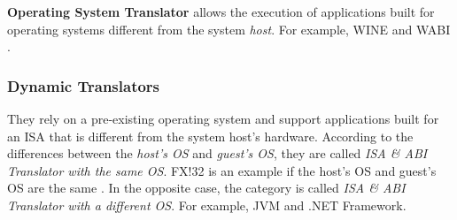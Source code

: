 	\textbf{Operating System Translator} allows the execution of applications built for operating systems different from the system \textit{host}. For example, WINE \cite{Wine} and WABI \cite{WABI}.
		
	\subsubsection {Dynamic Translators}
	
	They rely on a pre-existing operating system and support applications built for an ISA that is different from the system host's hardware. According to the differences between the \textit{host's OS} and \textit{guest's OS}, they are called \textit{ISA \& ABI Translator with the same OS}. FX!32 is an example if the host's OS and guest's OS are the same \cite{Chernoff1998}. In the opposite case, the category is called \textit{ISA \& ABI Translator with a different OS}. For example, JVM and .NET Framework.
	
	